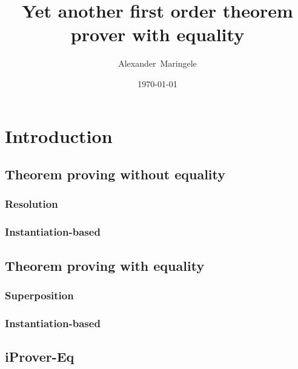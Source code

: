 \documentclass[]{clmthesis}
\begin{document}

\title{Yet another first order theorem prover with equality}
\author{Alexander~Maringele}
\date{\today}
\maketitle
\tableofcontents


\chapter{Introduction}




\section{Theorem proving without equality}
\subsection{Resolution}
\subsection{Instantiation-based}
\section{Theorem proving with equality}
\subsection{Superposition}
\subsection{Instantiation-based}
\section{iProver-Eq}
\end{document}
